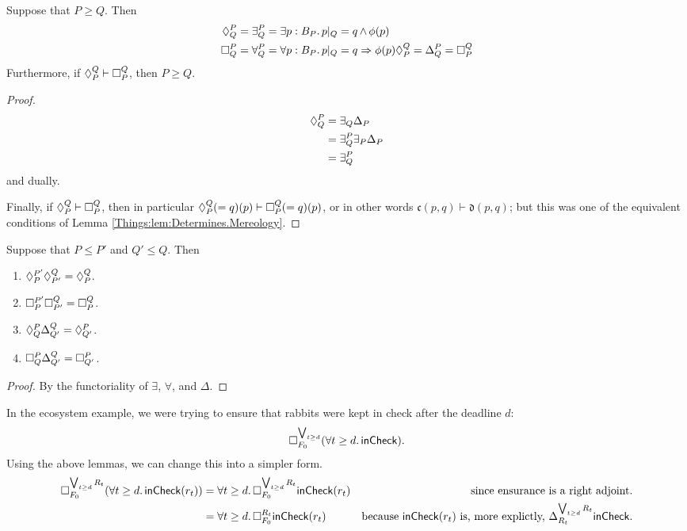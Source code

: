 \begin{claim}
Suppose that $P \geq Q$. Then
\begin{align*}
    \compat{P}{Q} &= \exists^P_Q = \exists p : B_P.\, p|_Q = q \meet \phi(p) \\
    \ensure{P}{Q} &= \forall^P_Q = \forall p : B_P.\, p|_Q = q \Rightarrow \phi(p)
    \compat{Q}{P} = \Delta^P_Q = \ensure{Q}{P}
\end{align*}
Furthermore, if $\compat{Q}{P} \vdash \ensure{Q}{P}$, then $P \geq Q$.
\end{claim}
\begin{proof}
\begin{align*}
    \compat{P}{Q} &= \exists_Q \Delta_P \\
        &= \exists^P_Q \exists_P \Delta_P \\
        &= \exists^P_Q
\end{align*}
and dually.

Finally, if $\compat{Q}{P} \vdash \ensure{Q}{P}$, then in particular $\compat{Q}{P}(=q)(p) \vdash \ensure{Q}{P}(=q)(p)$, or in other words $\mathfrak{c}(p, q) \vdash \mathfrak{d}(p, q)$; but this was one of the equivalent conditions of Lemma \ref{Things:lem:Determines.Mereology}.
\end{proof}

\begin{claim}
Suppose that $P \leq P'$ and $Q' \leq Q$. Then
\begin{enumerate}
    \item $\compat{P'}{P} \compat{Q}{P'} = \compat{Q}{P}$.
    \item $\ensure{P'}{P} \ensure{Q}{P'} = \ensure{Q}{P}$.
    \item $\compat{P}{Q} \Delta^{Q}_{Q'} = \compat{P}{Q'}$.
    \item $\ensure{P}{Q} \Delta^{Q}_{Q'} = \ensure{P}{Q'}$.
\end{enumerate}
\end{claim}
\begin{proof}
By the functoriality of $\exists$, $\forall$, and $\Delta$.
\end{proof}

\begin{ex}
In the ecosystem example, we were trying to ensure that rabbits were kept in check after the deadline $d$:
$$\ensure{\bigvee_{t \geq d}}{F_0}(\forall t \geq d.\, \term{inCheck}).$$
Using the above lemmas, we can change this into a simpler form.
\begin{align*}
    \ensure{\bigvee_{t \geq d} R_t}{F_0}(\forall t \geq d.\, \term{inCheck}(r_t)) &= \forall t \geq d.\, \ensure{\bigvee_{t \geq d} R_t}{F_0}\term{inCheck}(r_t) &\mbox{since ensurance is a right adjoint.} \\
    &= \forall t \geq d.\, \ensure{R_t}{F_0}\term{inCheck}(r_t) &\mbox{because $\term{inCheck}(r_t)$ is, more explictly, $\Delta^{\bigvee_{t \geq d} R_t}_{R_t}\term{inCheck}$.}
\end{align*}
\end{ex}

